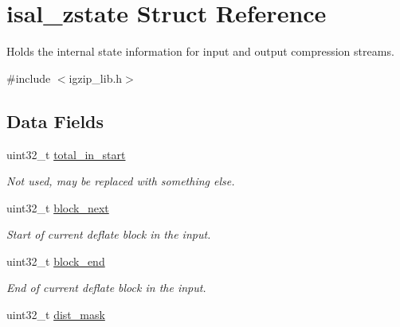 \hypertarget{structisal__zstate}{\section{isal\-\_\-zstate Struct Reference}
\label{structisal__zstate}
}


Holds the internal state information for input and output compression streams.  




{\ttfamily \#include $<$igzip\-\_\-lib.\-h$>$}

\subsection*{Data Fields}
\begin{DoxyCompactItemize}
\item 
\hypertarget{structisal__zstate_a990d24372549ff1a52b4c979f9d33fe5}{uint32\-\_\-t \hyperlink{structisal__zstate_a990d24372549ff1a52b4c979f9d33fe5}{total\-\_\-in\-\_\-start}}\label{structisal__zstate_a990d24372549ff1a52b4c979f9d33fe5}

\begin{DoxyCompactList}\small\item\em Not used, may be replaced with something else. \end{DoxyCompactList}\item 
\hypertarget{structisal__zstate_a906c377decb19fa260c2cf095b0814e9}{uint32\-\_\-t \hyperlink{structisal__zstate_a906c377decb19fa260c2cf095b0814e9}{block\-\_\-next}}\label{structisal__zstate_a906c377decb19fa260c2cf095b0814e9}

\begin{DoxyCompactList}\small\item\em Start of current deflate block in the input. \end{DoxyCompactList}\item 
\hypertarget{structisal__zstate_aee5434d36c06853f78f715fb9cd37482}{uint32\-\_\-t \hyperlink{structisal__zstate_aee5434d36c06853f78f715fb9cd37482}{block\-\_\-end}}\label{structisal__zstate_aee5434d36c06853f78f715fb9cd37482}

\begin{DoxyCompactList}\small\item\em End of current deflate block in the input. \end{DoxyCompactList}\item 
\hypertarget{structisal__zstate_aa5c0d828386bc413bac15d1b76dc7e6b}{uint32\-\_\-t \hyperlink{structisal__zstate_aa5c0d828386bc413bac15d1b76dc7e6b}{dist\-\_\-mask}}\label{structisal__zstate_aa5c0d828386bc413bac15d1b76dc7e6b}


\end{DoxyCompactItemize}
